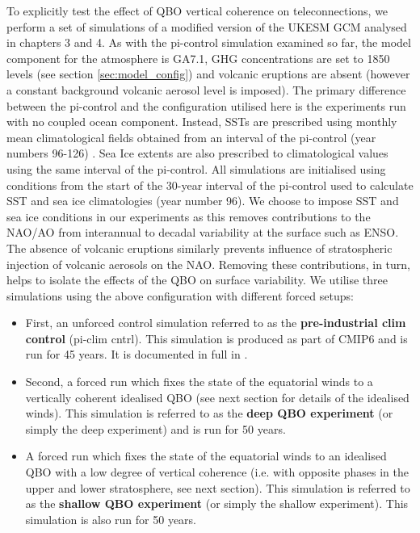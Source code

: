 To explicitly test the effect of QBO vertical coherence on teleconnections, we perform a set of simulations of a modified version of the UKESM GCM analysed in chapters 3 and 4. As with the pi-control simulation examined so far, the model component for the atmosphere is GA7.1, GHG concentrations are set to 1850 levels (see section \ref{sec:model_config}) and volcanic eruptions are absent (however a constant background volcanic aerosol level is imposed). The primary difference between the pi-control and the configuration utilised here is the experiments run with no coupled ocean component. Instead, SSTs are prescribed using monthly mean climatological fields obtained from an interval of the pi-control (year numbers 96-126) \citep{oconnorAssessment2021b}. Sea Ice extents are also prescribed to climatological values using the same interval of the pi-control. All simulations are initialised using conditions from the start of the 30-year interval of the pi-control used to calculate SST and sea ice climatologies (year number 96). We choose to impose SST and sea ice conditions in our experiments as this removes contributions to the NAO/AO from interannual to decadal variability at the surface such as ENSO. The absence of volcanic eruptions similarly prevents influence of stratospheric injection of volcanic aerosols on the NAO. Removing these contributions, in turn, helps to isolate the effects of the QBO on surface variability. We utilise three simulations using the above configuration with different forced setups:

\begin{itemize}
    \item First, an unforced control simulation referred to as the \textbf{pre-industrial clim control} (pi-clim cntrl). This simulation is produced as part of CMIP6 and is run for 45 years. It is documented in full in \cite{oconnorAssessment2021b}. 
    
    \item Second, a forced run which fixes the state of the equatorial winds to a vertically coherent idealised QBO (see next section for details of the idealised winds). This simulation is referred to as the \textbf{deep QBO experiment} (or simply the deep experiment) and is run for 50 years.
    
    \item A forced run which fixes the state of the equatorial winds to an idealised QBO with a low degree of vertical coherence (i.e. with opposite phases in the upper and lower stratosphere, see next section). This simulation is referred to as the \textbf{shallow QBO experiment} (or simply the shallow experiment). This simulation is also run for 50 years.
    
\end{itemize}

